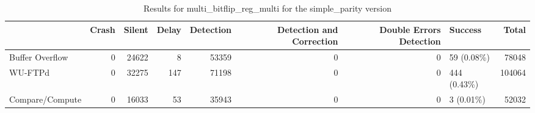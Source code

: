 \begin{table}[t]
	\centering
	\caption{Results for multi_bitflip_reg_multi for the simple_parity version}
	\label{table:end_sim_by_status_simple_parity_1_multi_bitflip_reg_multi}
	\begin{tabular}{lrrrrrrlr}
		\toprule
		                & Crash & Silent & Delay & Detection & Detection and Correction & Double Errors Detection & Success      & Total  \\
		\midrule
		Buffer Overflow & 0     & 24622  & 8     & 53359     & 0                        & 0                       & 59 (0.08\%)  & 78048  \\
		WU-FTPd         & 0     & 32275  & 147   & 71198     & 0                        & 0                       & 444 (0.43\%) & 104064 \\
		Compare/Compute & 0     & 16033  & 53    & 35943     & 0                        & 0                       & 3 (0.01\%)   & 52032  \\
		\bottomrule
	\end{tabular}
\end{table}
